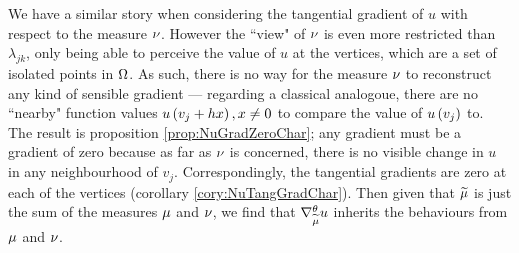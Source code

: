 We have a similar story when considering the tangential gradient of $u$ with respect to the measure $\nu$.
However the ``view" of $\nu$ is even more restricted than $\lambda_{jk}$, only being able to perceive the value of $u$ at the vertices, which are a set of isolated points in $\Omega$.
As such, there is no way for the measure $\nu$ to reconstruct any kind of sensible gradient --- regarding a classical analogoue, there are no ``nearby" function values $u\left( v_j + h x \right), x\neq 0$ to compare the value of $u\left( v_j \right)$ to.
The result is proposition \ref{prop:NuGradZeroChar}; any gradient must be a gradient of zero because as far as $\nu$ is concerned, there is no visible change in $u$ in any neighbourhood of $v_j$.
Correspondingly, the tangential gradients are zero at each of the vertices (corollary \ref{cory:NuTangGradChar}).
Then given that $\widetilde{\mu}$  is just the sum of the measures $\mu$ and $\nu$, we find that $\nabla^{\theta}_{\widetilde{\mu}}u$ inherits the behaviours from $\mu$ and $\nu$.

